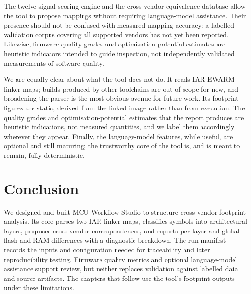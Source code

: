 The twelve-signal scoring engine and the cross-vendor equivalence database allow the tool to
propose mappings without requiring language-model assistance. Their presence should not be
confused with measured mapping accuracy: a labelled validation corpus covering all supported
vendors has not yet been reported. Likewise, firmware quality grades and
optimisation-potential estimates are heuristic indicators intended to guide inspection, not
independently validated measurements of software quality.

We are equally clear about what the tool does not do. It reads IAR EWARM linker maps; builds
produced by other toolchains are out of scope for now, and broadening the parser is the most
obvious avenue for future work. Its footprint figures are static, derived from the linked image
rather than from execution. The quality grades and optimisation-potential estimates that the
report produces are heuristic indications, not measured quantities, and we label them
accordingly wherever they appear. Finally, the language-model features, while useful, are
optional and still maturing; the trustworthy core of the tool is, and is meant to remain, fully
deterministic.

\section*{Conclusion}

We designed and built MCU Workflow Studio to structure cross-vendor footprint analysis. Its
core parses two IAR linker maps, classifies symbols into architectural layers, proposes
cross-vendor correspondences, and reports per-layer and global flash and RAM differences
with a diagnostic breakdown. The run manifest records the inputs and configuration needed
for traceability and later reproducibility testing. Firmware quality metrics and optional
language-model assistance support review, but neither replaces validation against labelled
data and source artifacts. The chapters that follow use the tool's footprint outputs under
these limitations.
